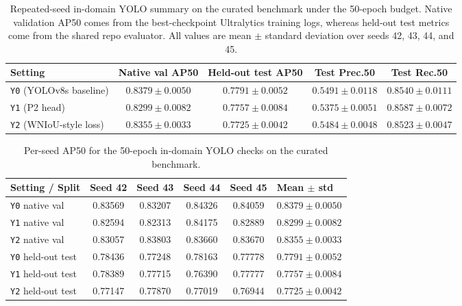 \documentclass[10pt,a4paper]{article}
\begin{document}
\begin{table}[t]
  \centering
  \caption{Repeated-seed in-domain YOLO summary on the curated benchmark under the 50-epoch budget. Native validation AP50 comes from the best-checkpoint Ultralytics training logs, whereas held-out test metrics come from the shared repo evaluator. All values are mean $\pm$ standard deviation over seeds 42, 43, 44, and 45.}
  \label{tab:app-curated-summary}
  \footnotesize
  \setlength{\tabcolsep}{4pt}
  \begin{tabularx}{\textwidth}{>{\raggedright\arraybackslash}p{} c c c c}
    \toprule
    Setting & Native val AP50 & Held-out test AP50 & Test Prec.50 & Test Rec.50 \\
    \midrule
    \texttt{Y0} (YOLOv8s baseline) & $0.8379 \pm 0.0050$ & $0.7791 \pm 0.0052$ & $0.5491 \pm 0.0118$ & $0.8540 \pm 0.0111$ \\
    \texttt{Y1} (P2 head) & $0.8299 \pm 0.0082$ & $0.7757 \pm 0.0084$ & $0.5375 \pm 0.0051$ & $0.8587 \pm 0.0072$ \\
    \texttt{Y2} (WNIoU-style loss) & $0.8355 \pm 0.0033$ & $0.7725 \pm 0.0042$ & $0.5484 \pm 0.0048$ & $0.8523 \pm 0.0047$ \\
    \bottomrule
  \end{tabularx}
\end{table}

\begin{table}[t]
  \centering
  \caption{Per-seed AP50 for the 50-epoch in-domain YOLO checks on the curated benchmark.}
  \label{tab:app-curated-perseed}
  \scriptsize
  \setlength{\tabcolsep}{4pt}
  \begin{tabularx}{\textwidth}{>{\raggedright\arraybackslash}p{} c c c c X}
    \toprule
    Setting / Split & Seed 42 & Seed 43 & Seed 44 & Seed 45 & Mean $\pm$ std \\
    \midrule
    \texttt{Y0} native val & 0.83569 & 0.83207 & 0.84326 & 0.84059 & $0.8379 \pm 0.0050$ \\
    \texttt{Y1} native val & 0.82594 & 0.82313 & 0.84175 & 0.82889 & $0.8299 \pm 0.0082$ \\
    \texttt{Y2} native val & 0.83057 & 0.83803 & 0.83660 & 0.83670 & $0.8355 \pm 0.0033$ \\
    \texttt{Y0} held-out test & 0.78436 & 0.77248 & 0.78163 & 0.77778 & $0.7791 \pm 0.0052$ \\
    \texttt{Y1} held-out test & 0.78389 & 0.77715 & 0.76390 & 0.77777 & $0.7757 \pm 0.0084$ \\
    \texttt{Y2} held-out test & 0.77147 & 0.77870 & 0.77019 & 0.76944 & $0.7725 \pm 0.0042$ \\
    \bottomrule
  \end{tabularx}
\end{table}
\end{document}
